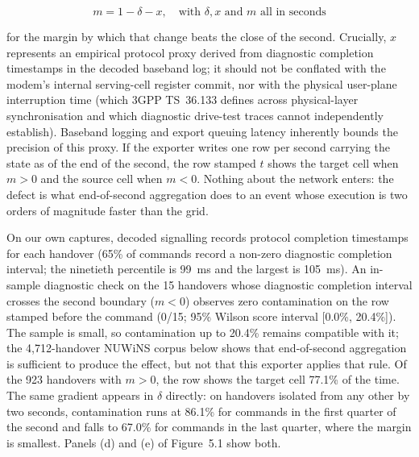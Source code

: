 \begin{equation}\label{eq:5_1} m = 1 - \delta - x, \quad \text{with } \delta, x \text{ and } m \text{ all in seconds} \end{equation}

for the margin by which that change beats the close of the second. Crucially, $x$ represents an empirical protocol proxy derived from diagnostic completion timestamps in the decoded baseband log; it should not be conflated with the modem's internal serving-cell register commit, nor with the physical user-plane interruption time (which 3GPP TS~36.133 defines across physical-layer synchronisation and which diagnostic drive-test traces cannot independently establish). Baseband logging and export queuing latency inherently bounds the precision of this proxy. If the exporter writes one row per second carrying the state as of the end of the second, the row stamped $t$ shows the target cell when $m > 0$ and the source cell when $m < 0$. Nothing about the network enters: the defect is what end-of-second aggregation does to an event whose execution is two orders of magnitude faster than the grid.

On our own captures, decoded signalling records protocol completion timestamps for each handover (65\% of commands record a non-zero diagnostic completion interval; the ninetieth percentile is 99~ms and the largest is 105~ms). An in-sample diagnostic check on the 15 handovers whose diagnostic completion interval crosses the second boundary ($m < 0$) observes zero contamination on the row stamped before the command (0/15; 95\% Wilson score interval [0.0\%, 20.4\%]). The sample is small, so contamination up to 20.4\% remains compatible with it; the 4,712-handover NUWiNS corpus below shows that end-of-second aggregation is sufficient to produce the effect, but not that this exporter applies that rule. Of the 923 handovers with $m > 0$, the row shows the target cell 77.1\% of the time. The same gradient appears in $\delta$ directly: on handovers isolated from any other by two seconds, contamination runs at 86.1\% for commands in the first quarter of the second and falls to 67.0\% for commands in the last quarter, where the margin is smallest. Panels (d) and (e) of Figure~5.1 show both.


